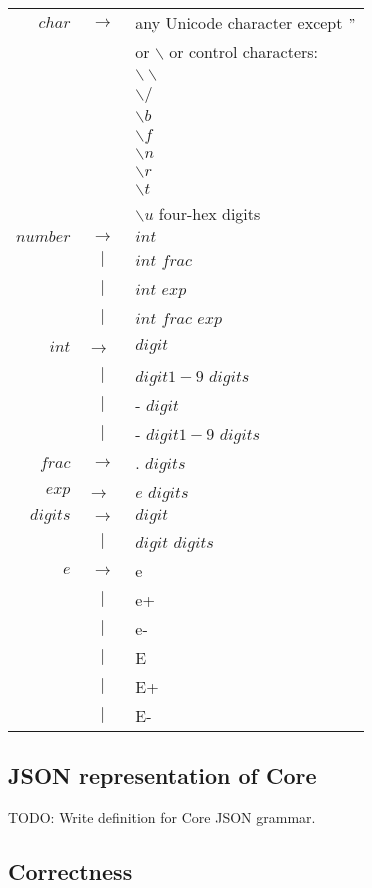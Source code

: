 \documentclass{article}
\begin{document}
\begin{tabular}{ r c l }
$char$		& $ \rightarrow $	& any Unicode character except $"$ \\ 
		&			& or $\backslash$ or control characters: \\
		&			& $\backslash\backslash$	\\
		&			& $\backslash /$ 		\\
		&			& $\backslash b$ 		\\
		& 			& $\backslash f$ 		\\
		&			& $\backslash n$		\\
		& 			& $\backslash r$ 		\\
		& 			& $\backslash t$ 		\\
		& 			& $\backslash u$ four-hex digits\\
$number$	& $ \rightarrow $ 	& $int$ 			\\
		& $ | $			& $int$ $frac$			\\
		& $ | $			& $int$ $exp$			\\
		& $ | $			& $int$ $frac$ $exp$		\\
$int$		& $ \rightarrow$ 	& $digit$			\\
		& $ | $ 		& $digit1-9$ $digits$		\\
		& $ | $ 		& - $digit$			\\
		& $ | $ 		& - $digit1-9$ $digits$	\\
$frac$ 		& $ \rightarrow $ 	& . $digits$ 		\\
$exp$		& $ \rightarrow $ 	& $e$ $digits$ 			\\
$digits$	& $ \rightarrow $ 	& $digit$			\\
		& $ | $ 		& $digit$ $digits$		\\
$e$		& $ \rightarrow $ 	& e				\\
		& $ | $ 		& e+				\\
		& $ | $ 		& e- 				\\
		& $ | $ 		& E				\\
		& $ | $ 		& E+				\\
		& $ | $ 		& E-				\\
\end{tabular}

\subsection{JSON representation of Core}

TODO: Write definition for Core JSON grammar.

\subsection{Correctness}
\end{document}
